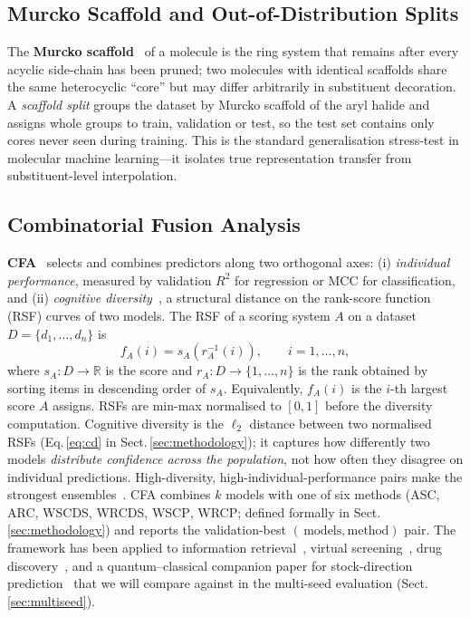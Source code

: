 \documentclass[conference]{IEEEtran}
\begin{document}
\subsection{Murcko Scaffold and Out-of-Distribution Splits}
The \textbf{Murcko scaffold}~\cite{Bemis1996} of a molecule is the ring
system that remains after every acyclic side-chain has been pruned; two
molecules with identical scaffolds share the same heterocyclic ``core''
but may differ arbitrarily in substituent decoration. A \emph{scaffold
split} groups the dataset by Murcko scaffold of the aryl halide and assigns
whole groups to train, validation or test, so the test set contains only
cores never seen during training. This is the standard generalisation
stress-test in molecular machine learning---it isolates true representation
transfer from substituent-level interpolation.

\subsection{Combinatorial Fusion Analysis}
\textbf{CFA}~\cite{Hsu2002DIMACS,Hsu2005Fusion,Lin2007,Hurley2021}
selects and combines predictors along two orthogonal axes:
(i) \emph{individual performance}, measured by validation $R^{2}$ for
regression or MCC for classification, and
(ii) \emph{cognitive diversity}~\cite{Hsu2019CD}, a structural distance on
the rank-score function (RSF) curves of two models. The RSF of a scoring
system $A$ on a dataset $D=\{d_{1},\ldots,d_{n}\}$ is
\begin{equation}
f_{A}(i) = s_{A}\!\left(r_{A}^{-1}(i)\right),\qquad i = 1,\ldots,n,
\label{eq:rsf}
\end{equation}
where $s_{A}: D \to \mathbb{R}$ is the score and
$r_{A}: D \to \{1,\ldots,n\}$ is the rank obtained by sorting items in
descending order of $s_{A}$. Equivalently, $f_{A}(i)$ is the $i$-th largest
score $A$ assigns. RSFs are min-max normalised to $[0,1]$ before the
diversity computation. Cognitive diversity is the $\ell_{2}$ distance
between two normalised RSFs (Eq.\,\ref{eq:cd} in
Sect.\,\ref{sec:methodology}); it captures how differently two models
\emph{distribute confidence across the population}, not how often they
disagree on individual predictions. High-diversity,
high-individual-performance pairs make the strongest
ensembles~\cite{Hsu2005Fusion,Hurley2021,Hsu2019CD}. CFA combines $k$
models with one of six methods (\textsc{ASC}, \textsc{ARC},
\textsc{WSCDS}, \textsc{WRCDS}, \textsc{WSCP}, \textsc{WRCP}; defined
formally in Sect.\,\ref{sec:methodology}) and reports the validation-best
$(\,\text{models},\text{method})$ pair. The framework has been applied to
information retrieval~\cite{Hsu2005Fusion}, virtual
screening~\cite{Yang2005Consensus}, drug
discovery~\cite{Jiang2023ADMET,Hurley2021}, and a quantum--classical
companion paper for stock-direction prediction~\cite{Patten2026Quantum}
that we will compare against in the multi-seed evaluation
(Sect.\,\ref{sec:multiseed}).
\end{document}
